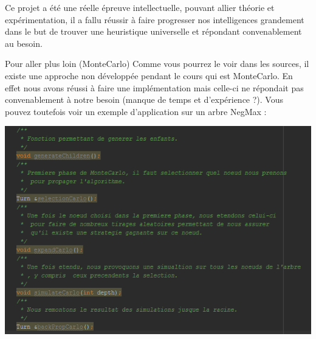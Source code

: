 \documentclass[a4paper]{article}
\makeatletter
\renewcommand{\section}{\@startsection{section}{1}{\z@}
{-4ex \@plus -1ex \@minus -.4ex}
{1ex \@plus.2ex }
{\normalfont\large\sffamily\bfseries}}
\makeatother
\begin{document}
Ce projet a été une réelle épreuve intellectuelle, pouvant allier théorie et expérimentation, il a fallu réussir à faire progresser nos intelligences grandement dans le but de trouver une heuristique universelle et répondant convenablement au besoin.

\section{Pour aller plus loin (MonteCarlo)}
Comme vous pourrez le voir dans les sources, il existe une approche non développée pendant le cours qui est MonteCarlo. En effet nous avons réussi à faire une implémentation mais celle-ci ne répondait pas convenablement à notre besoin (manque de temps et d'expérience ?). Vous pouvez toutefois voir un exemple d'application sur un arbre NegMax :

\begin{center}
\includegraphics[scale=.9]{ressources/MC.png}
\end{center}
\end{document}
